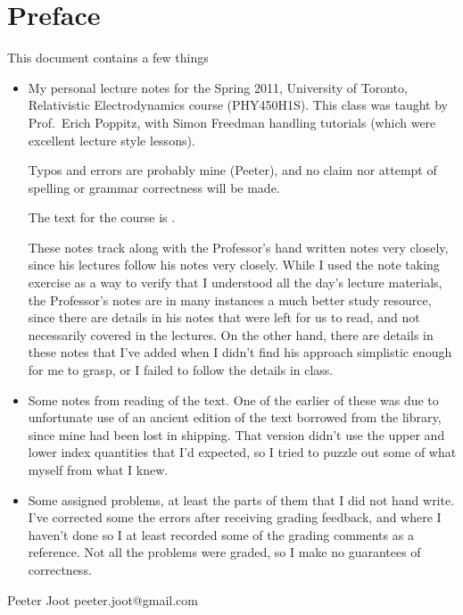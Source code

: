 \chapter*{Preface}\normalsize

This document contains a few things

\begin{itemize}
\item My personal lecture notes for the Spring 2011, University of Toronto, Relativistic Electrodynamics course (PHY450H1S).  This class was taught by Prof.\ Erich Poppitz, with Simon Freedman handling tutorials (which were excellent lecture style lessons).

Typos and errors are probably mine (Peeter), and no claim nor attempt of spelling or grammar correctness will be made.  

The text for the course is \citep{landau1980classical}.

These notes track along with the Professor's hand written notes very closely, since his lectures follow his notes very closely.  While I used the note taking exercise as a way to verify that I understood all the day's lecture materials, the Professor's notes are in many instances a much better study resource, since there are details in his notes that were left for us to read, and not necessarily covered in the lectures.  On the other hand, there are details in these notes that I've added when I didn't find his approach simplistic enough for me to grasp, or I failed to follow the details in class.

\item Some notes from reading of the text.  One of the earlier of these was due to unfortunate use of an ancient edition of the text borrowed from the library, since mine had been lost in shipping.  That version didn't use the upper and lower index quantities that I'd expected, so I tried to puzzle out some of what myself from what I knew.

\item Some assigned problems, at least the parts of them that I did not hand write.  I've corrected some the errors after receiving grading feedback, and where I haven't done so I at least recorded some of the grading comments as a reference.  Not all the problems were graded, so I make no guarantees of correctness.

%
\end{itemize}

Peeter Joot  \quad peeter.joot@gmail.com 
